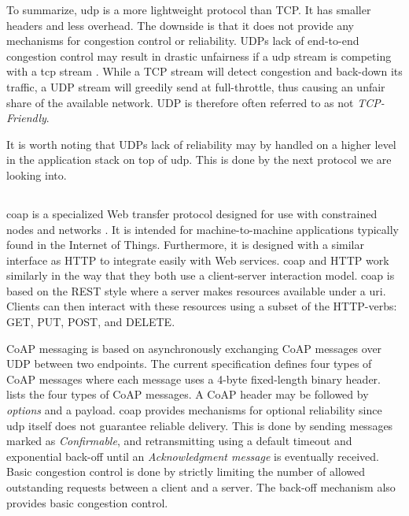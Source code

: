 To summarize, \gls{udp} is a more lightweight protocol than TCP. It has smaller
headers and less overhead. The downside is that it does not provide any
mechanisms for congestion control or reliability. UDPs lack of end-to-end
congestion control may result in drastic unfairness if a \gls{udp} stream is
competing with a \gls{tcp} stream \cite{floyd-congestion}. While a TCP stream
will detect congestion and back-down its traffic, a UDP stream will greedily
send at full-throttle, thus causing an unfair share of the available network.
UDP is therefore often referred to as not \textit{TCP-Friendly}.

 It is worth noting that UDPs lack of reliability may by handled on a higher
 level in the application stack on top of \gls{udp}. This is done by the next
 protocol we are looking into.

\subsection{}

\gls{coap} is a specialized Web transfer protocol designed for use with
constrained nodes and  networks \cite{rfc-7252}. It is intended for
machine-to-machine applications typically found in the Internet of Things.
Furthermore, it is designed with a similar interface as HTTP to integrate easily
with Web services. \gls{coap} and HTTP work similarly in the way that they both
use a client-server interaction model. \Gls{coap} is based on the REST style
where a server makes resources available under a \gls{uri}. Clients can then
interact with these resources using a subset of the HTTP-verbs: GET, PUT, POST,
and DELETE.

CoAP messaging is based on asynchronously exchanging CoAP messages over UDP
between two endpoints. The current specification defines four types of CoAP
messages where each message uses a 4-byte fixed-length binary header.
 lists the four types of CoAP messages. A CoAP header
may be followed by \textit{options} and a payload. \Gls{coap} provides
mechanisms for optional reliability since \gls{udp} itself does not guarantee
reliable delivery. This is done by sending messages marked as
\textit{Confirmable}, and retransmitting using a default timeout and exponential
back-off until an \textit{Acknowledgment message} is eventually received. Basic
congestion control is done by strictly limiting the number of allowed
outstanding requests between a client and a server. The back-off mechanism also
provides basic congestion control.

